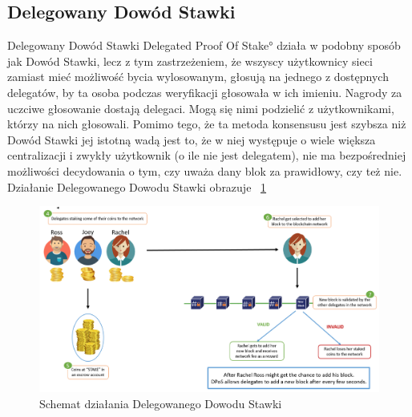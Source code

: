 \subsection{Delegowany Dowód Stawki}
\label{ssec:DPoS}

Delegowany Dowód Stawki \ang{Delegated Proof Of Stake} działa w podobny sposób jak Dowód Stawki, lecz z tym zastrzeżeniem, że wszyscy użytkownicy sieci zamiast mieć możliwość bycia wylosowanym, głosują na jednego z dostępnych delegatów, by ta osoba podczas weryfikacji głosowała w ich imieniu. Nagrody za uczciwe głosowanie dostają delegaci. Mogą się nimi podzielić z użytkownikami, którzy na nich głosowali. Pomimo tego, że ta metoda konsensusu jest szybsza niż Dowód Stawki jej istotną wadą jest to, że w niej występuje o wiele większa centralizacji i zwykły użytkownik (o ile nie jest delegatem), nie ma bezpośredniej możliwości decydowania o tym, czy uważa dany blok za prawidłowy, czy też nie.
Działanie Delegowanego Dowodu Stawki obrazuje \figurename{~\ref{fig:ConsensusDPOS}}
\clearpage
\begin{figure}[ht]
    \centering
    \includegraphics[width=\textwidth]{Images/ConsensusDPOS.png}
    \caption{Schemat działania Delegowanego Dowodu Stawki}
    \label{fig:ConsensusDPOS}
\end{figure}

